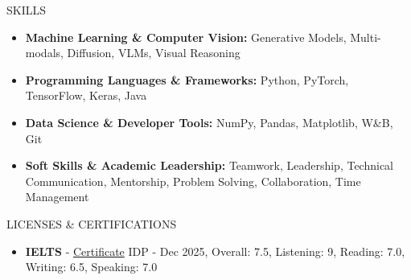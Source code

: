 \documentclass[]{CV}
\begin{document}
\begin{section}{SKILLS}
\begin{itemize}
    \item \textbf{Machine Learning \& Computer Vision:} Generative Models, Multi-modals, Diffusion, VLMs, Visual Reasoning
    \item \textbf{Programming Languages \& Frameworks:} Python, PyTorch, TensorFlow, Keras, Java
    \item \textbf{Data Science \& Developer Tools:} NumPy, Pandas, Matplotlib, W\&B, Git
    \item \textbf{Soft Skills \& Academic Leadership:} Teamwork, Leadership, Technical Communication, Mentorship, Problem Solving, Collaboration, Time Management
\end{itemize}
\end{section}

\begin{section}{LICENSES \& CERTIFICATIONS}
\begin{itemize}
    \item {\textbf{IELTS} - \href{https://drive.google.com/file/d/1XfEYpe3-X4sc2bJJEsDmZZdFyORwvGaf/view?usp=drivesdk}{Certificate}}
    \newline IDP - Dec 2025, Overall: 7.5, Listening: 9, Reading: 7.0, Writing: 6.5, Speaking: 7.0
\end{itemize}
\end{section}
\end{document}
